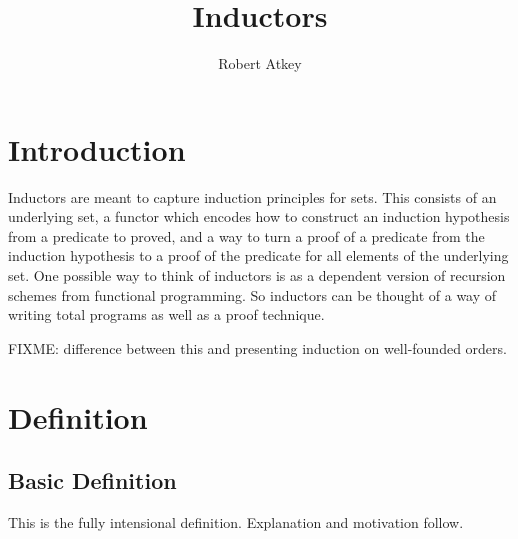 \documentclass{article}
\title{Inductors}
\author{Robert Atkey}
\begin{document}
\maketitle

\tableofcontents

\section{Introduction}

Inductors are meant to capture induction principles for sets. This
consists of an underlying set, a functor which encodes how to
construct an induction hypothesis from a predicate to proved, and a
way to turn a proof of a predicate from the induction hypothesis to a
proof of the predicate for all elements of the underlying set. One
possible way to think of inductors is as a dependent version of
recursion schemes from functional programming. So inductors can be
thought of a way of writing total programs as well as a proof
technique.

FIXME: difference between this and presenting induction on
well-founded orders.

\section{Definition}

\subsection{Basic Definition}

This is the fully intensional definition. Explanation and motivation
follow.

\newcommand{\truth}{\mathsf{tr}}
\newcommand{\ind}{\mathsf{ind}}
\newcommand{\all}{\mathsf{all}}
\end{document}
